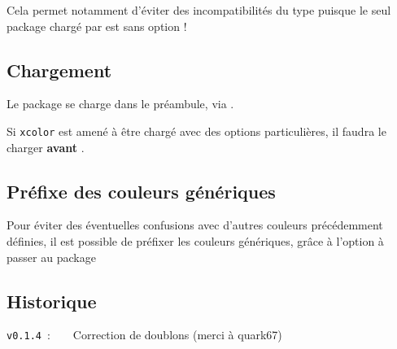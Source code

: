 \documentclass[french,11pt,a4paper]{article}
\begin{document}
\smallskip

Cela permet notamment d'éviter des incompatibilités du type  puisque le seul package chargé par  est  sans option !

\subsection{Chargement}

Le package se charge dans le préambule, via .

Si \texttt{xcolor} est amené à être chargé avec des options particulières, il faudra le charger \textbf{avant} .



\subsection{Préfixe des couleurs génériques}

Pour éviter des éventuelles confusions avec d'autres couleurs précédemment définies, il est possible de préfixer les couleurs génériques, grâce à l'option \MontreCode{[Prefixe]} à passer au package 


\subsection{Historique}

\verb|v0.1.4|~:~~~~Correction de doublons (merci à \textsf{quark67})
\end{document}
